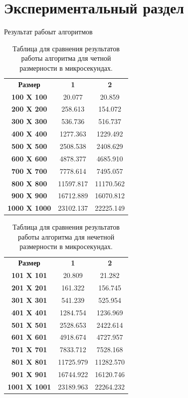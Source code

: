 \chapter{ Экспериментальный раздел}
Результат рабоыт алгоритмов

\begin{table}
	\label{tabular:even}
	\begin{center}
		\begin{tabular}{ccc}
			\textbf{Размер} & \textbf{1} & \textbf{2} \\
			\textbf{100 X 100} & 20.077 & 20.859 \\
			\textbf{200 X 200} & 258.613 & 154.072 \\
			\textbf{300 X 300} & 536.736 & 516.737 \\
			\textbf{400 X 400} & 1277.363 & 1229.492 \\
			\textbf{500 X 500} & 2508.538 & 2408.629 \\
			\textbf{600 X 600} & 4878.377 & 4685.910 \\
			\textbf{700 X 700} & 7778.614 & 7495.057 \\
			\textbf{800 X 800} & 11597.817 & 11170.562 \\
			\textbf{900 X 900} & 16712.889 & 16070.812 \\
			\textbf{1000 X 1000} & 23102.137 & 22225.149 \\
		\end{tabular}
	\end{center}
	\caption{Таблица для сравнения результатов работы алгоритма для четной размерности в микросекундах.}
\end{table}

\begin{table}
	\label{tabular:noneven}
	\begin{center}
		\begin{tabular}{ccc}
			\textbf{Размер} & \textbf{1} & \textbf{2} \\
			\textbf{101 X 101} & 20.809 & 21.282 \\
			\textbf{201 X 201} & 161.322 & 156.745 \\
			\textbf{301 X 301} & 541.239 & 525.954 \\
			\textbf{401 X 401} & 1284.754 & 1236.969 \\
			\textbf{501 X 501} & 2528.653 & 2422.614 \\
			\textbf{601 X 601} & 4918.674 & 4727.957 \\
			\textbf{701 X 701} & 7833.712 & 7528.168 \\
			\textbf{801 X 801} & 11725.979 & 11282.570 \\
			\textbf{901 X 901} & 16744.922 & 16120.746 \\
			\textbf{1001 X 1001} & 23189.963 & 22264.232 \\
		\end{tabular}
	\end{center}
	\caption{Таблица для сравнения результатов работы алгоритма для нечетной размерности в микросекундах.}
\end{table}

